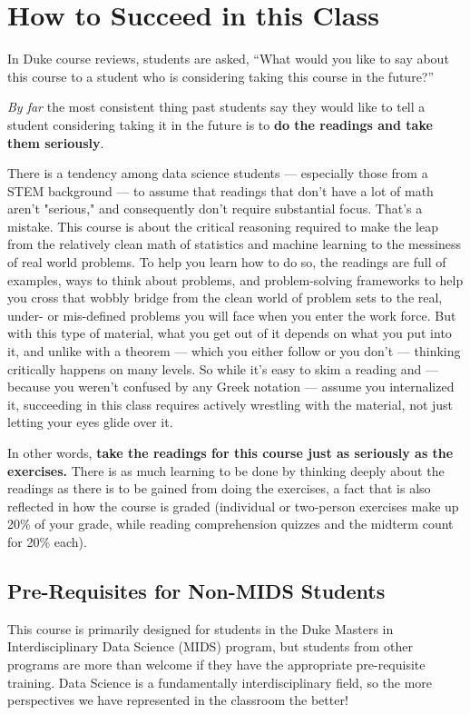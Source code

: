 \documentclass[12pt]{article}
\begin{document}
\section{How to Succeed in this Class}

In Duke course reviews, students are asked, ``What would you like to say about this course to a student who is considering taking this course in the future?''

\textit{By far} the most consistent thing past students say they would like to tell a student considering taking it in the future is to \textbf{do the readings and take them seriously}.

There is a tendency among data science students — especially those from a STEM background — to assume that readings that don't have a lot of math aren't "serious," and consequently don't require substantial focus. That's a mistake. This course is about the critical reasoning required to make the leap from the relatively clean math of statistics and machine learning to the messiness of real world problems. To help you learn how to do so, the readings are full of examples, ways to think about problems, and problem-solving frameworks to help you cross that wobbly bridge from the clean world of problem sets to the real, under- or mis-defined problems you will face when you enter the work force. But with this type of material, what you get out of it depends on what you put into it, and unlike with a theorem — which you either follow or you don't — thinking critically happens on many levels. So while it's easy to skim a reading and — because you weren't confused by any Greek notation — assume you internalized it, succeeding in this class requires actively wrestling with the material, not just letting your eyes glide over it.

In other words, \textbf{take the readings for this course just as seriously as the exercises.} There is as much learning to be done by thinking deeply about the readings as there is to be gained from doing the exercises, a fact that is also reflected in how the course is graded (individual or two-person exercises make up 20\% of your grade, while reading comprehension quizzes and the midterm count for 20\% each).

\subsection{Pre-Requisites for Non-MIDS Students}

This course is primarily designed for students in the Duke Masters in Interdisciplinary Data Science (MIDS) program, but students from other programs are more than welcome if they have the appropriate pre-requisite training. Data Science is a fundamentally interdisciplinary field, so the more perspectives we have represented in the classroom the better!
\end{document}

